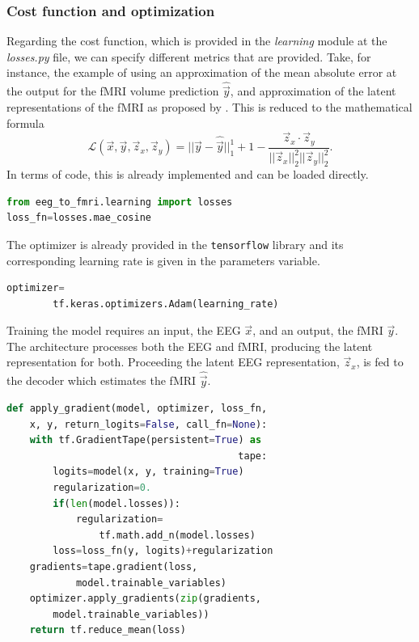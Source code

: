 \subsubsection{Cost function and optimization}

Regarding the cost function, which is provided in the \textit{learning} module at the \textit{losses.py} file, we can specify different metrics that are provided. Take, for instance, the example of using an approximation of the mean absolute error at the output for the fMRI volume prediction $\hat{\vec{y}}$, and approximation of the latent representations of the fMRI as proposed by \citep{calhas2022eeg}. This is reduced to the mathematical formula
\begin{equation}\label{equation:loss}
    \mathcal{L}(\vec{x}, \vec{y}, \vec{z}_x, \vec{z}_y) = ||\vec{y} - \hat{\vec{y}}||_1^1 + 1 - \frac{\vec{z}_x \cdot \vec{z}_y}{||\vec{z}_x||_2^2 ||\vec{z}_y||_2^2}.
\end{equation}
In terms of code, this is already implemented and can be loaded directly.
\begin{lstlisting}[language=python]
from eeg_to_fmri.learning import losses
loss_fn=losses.mae_cosine
\end{lstlisting}
The optimizer is already provided in the \texttt{tensorflow} library and its corresponding learning rate is given in the parameters variable.
\begin{lstlisting}[language=python]
optimizer=
        tf.keras.optimizers.Adam(learning_rate)
\end{lstlisting}
Training the model requires an input, the EEG $\vec{x}$, and an output, the fMRI $\vec{y}$. The architecture processes both the EEG and fMRI, producing the latent representation for both. Proceeding the latent EEG representation, $\vec{z}_x$, is fed to the decoder which estimates the fMRI $\hat{\vec{y}}$.
\begin{lstlisting}[language=python]
def apply_gradient(model, optimizer, loss_fn,
    x, y, return_logits=False, call_fn=None):
    with tf.GradientTape(persistent=True) as
                                        tape:
        logits=model(x, y, training=True)
        regularization=0.
        if(len(model.losses)):
            regularization=
                tf.math.add_n(model.losses)
        loss=loss_fn(y, logits)+regularization
    gradients=tape.gradient(loss,
            model.trainable_variables)
    optimizer.apply_gradients(zip(gradients,
        model.trainable_variables))
    return tf.reduce_mean(loss)
\end{lstlisting}
